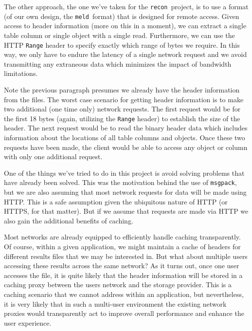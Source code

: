 \documentclass[11pt,a4paper,twocolumn]{article}
\newcommand{\recon}{\texttt{recon}}
\newcommand{\meld}{\texttt{meld}}
\newcommand{\msgpack}{\texttt{msgpack}}
\newcommand{\code}[1]{\texttt{#1}} %
\begin{document}
The other approach, the one we've taken for the \recon\ project, is to
use a format (of our own design, the \meld\ format) that is designed
for remote access.  Given access to header information (more on this
in a moment), we can extract a single table column or single object
with a single read.  Furthermore, we can use the HTTP \code{Range}
header to specify exactly which range of bytes we require.  In this
way, we only have to endure the latency of a single network request
and we avoid transmitting any extraneous data which minimizes the
impact of bandwidth limitations.


Note the previous paragraph presumes we already have the header
information from the files.  The worst case scenario for getting
header information is to make two additional (one time only) network
requests.  The first request would be for the first 18 bytes (again,
utilizing the \code{Range} header) to establish the size of the
header.  The next request would be to read the binary header data
which includes information about the locations of all table columns
and objects.  Once these two requests have been made, the client would
be able to access any object or column with only one additional
request.


One of the things we've tried to do in this project is avoid solving
problems that have already been solved.  This was the motivation
behind the use of \msgpack, but we are also assuming that most network
requests for data will be made using HTTP.  This is a safe assumption
given the ubiquitous nature of HTTP (or HTTPS, for that matter).  But
if we assume that requests are made via HTTP we also gain the
additional benefits of caching.

Most networks are already equipped to efficiently handle caching
transparently.  Of course, within a given application, we might
maintain a cache of headers for different results files that we may be
interested in.  But what about multiple users accessing these results
across the same network?  As it turns out, once one user accesses the
file, it is quite likely that the header information will be stored in
a caching proxy between the users network and the storage provider.
This is a caching scenario that we cannot address within an
application, but nevertheless, it is very likely that in such a
multi-user environment the existing network proxies would
transparently act to improve overall performance and enhance the user
experience.
\end{document}

